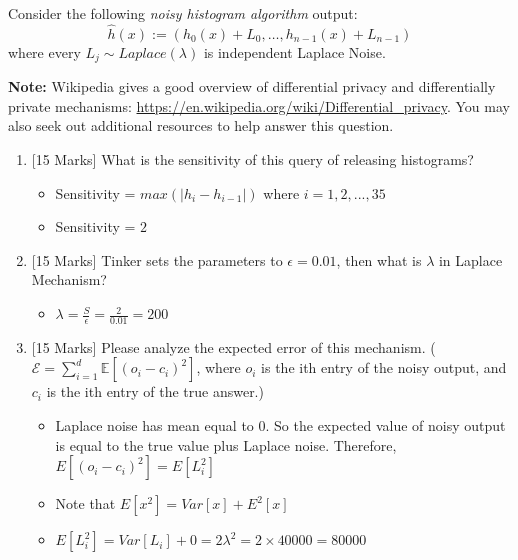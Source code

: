\documentclass{article}
\newcommand{\0}{\mathbf{0}}
\newcommand{\1}{\mathbf{1}}
\begin{document}
\begin{enumerate}
		Consider the following \emph{noisy histogram algorithm} output: 
		$$\hat{h}(x) := \left(h_0(x) + L_0,\dots, h_{{n-1}}(x) + L_{{n-1}}\right)$$ 
		where every $L_j \sim Laplace(\lambda)$ is independent Laplace Noise.
   		
		
		\medskip
		\textbf{Note:} Wikipedia gives a good overview of differential privacy and 
		differentially private mechanisms: \url{https://en.wikipedia.org/wiki/Differential_privacy}. You may also seek out additional resources to help answer this 
		question.\\

        \begin{enumerate}
        \item {[15 Marks]} What is the sensitivity of this query of releasing histograms?
			\begin{itemize}
				\item Sensitivity = $max(|h_i - h_{i-1}|)$ where $i = 1,2,...,35$
				\item Sensitivity = $2$
			\end{itemize}

        \item {[15 Marks]} Tinker sets the parameters to $\epsilon = 0.01$, then what is $\lambda$ in Laplace Mechanism?
			\begin{itemize}
				\item $\lambda = \frac{S}{\epsilon} = \frac{2}{0.01} = 200$
			\end{itemize}

        \item {[15 Marks]} Please analyze the expected error of this mechanism. ($\mathcal{E} = \sum_{i=1}^d \mathbb{E} [(o_i-c_i)^2]$, where $o_i$ is the ith entry of the noisy output, and $c_i$ is the ith entry of the true answer.)
			\begin{itemize}
				\item Laplace noise has mean equal to 0. So the expected value of noisy output is equal to the true value plus Laplace noise. Therefore, $E[(o_i-c_i)^2]=E[L_i^2]$
				\item Note that $E[x^2] = Var[x] + E^2[x]$
				\item $E[L_i^2]=Var[L_i]+0=2\lambda^2=2\times 40000=80000$
			\end{itemize}
        

\end{enumerate}
\end{enumerate}
\end{document}
